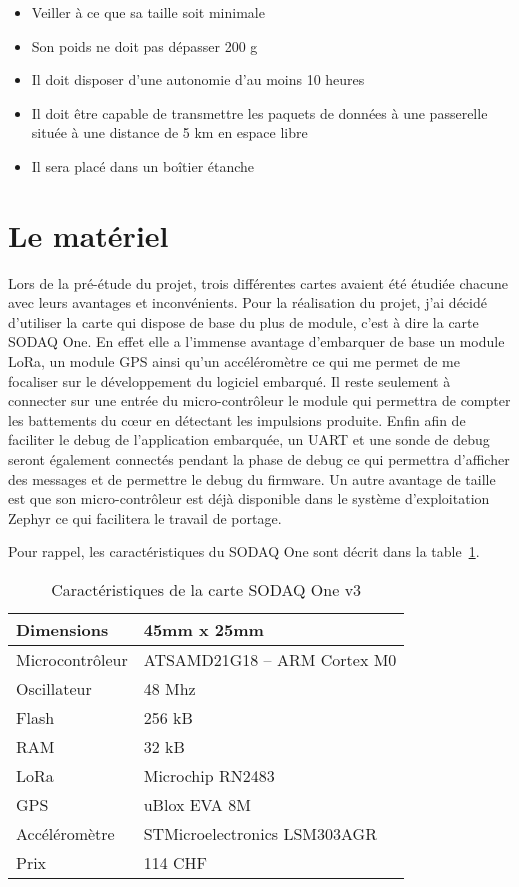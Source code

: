 \begin{itemize}
\item Veiller à ce que sa taille soit minimale
\item Son poids ne doit pas dépasser 200 g
\item Il doit disposer d'une autonomie d'au moins 10 heures
\item Il doit être capable de transmettre les paquets de données à une passerelle située à une distance de 5 km en espace libre
\item Il sera placé dans un boîtier étanche
\end{itemize}

\section{Le matériel}

Lors de la pré-étude du projet, trois différentes cartes avaient été étudiée chacune avec leurs avantages et inconvénients. Pour la réalisation du projet, j'ai décidé d'utiliser la carte qui dispose de base du plus de module, c'est à dire la carte SODAQ One. En effet elle a l'immense avantage d'embarquer de base un module LoRa, un module GPS ainsi qu'un accéléromètre ce qui me permet de me focaliser sur le développement du logiciel embarqué. Il reste seulement à connecter sur une entrée du micro-contrôleur le module qui permettra de compter les battements du cœur en détectant les impulsions produite. Enfin afin de faciliter le debug de l'application embarquée, un UART et une sonde de debug seront également connectés pendant la phase de debug ce qui permettra d'afficher des messages et de permettre le debug du firmware. Un autre avantage de taille est que son micro-contrôleur est déjà disponible dans le système d'exploitation Zephyr ce qui facilitera le travail de portage.

Pour rappel, les caractéristiques du SODAQ One sont décrit dans la table~\ref{tab:sodaq_one_cara}.

\begin{table}[htb]
\caption[Caractéristiques de la carte SODAQ One v3]{Caractéristiques de la carte SODAQ One v3}
\label{tab:sodaq_one_cara}
\centering
\begin{tabular}{ l | l }
\toprule
Dimensions & 45mm x 25mm \\
\midrule
Microcontrôleur & ATSAMD21G18 – ARM Cortex M0 \\
\midrule
Oscillateur & 48 Mhz \\
\midrule
Flash & 256 kB \\
\midrule
RAM & 32 kB \\
\midrule
LoRa & Microchip RN2483 \\
\midrule
GPS & uBlox EVA 8M \\
\midrule
Accéléromètre & STMicroelectronics LSM303AGR \\
\midrule
Prix & 114 CHF\\
\bottomrule 
\end{tabular}
\end{table}

